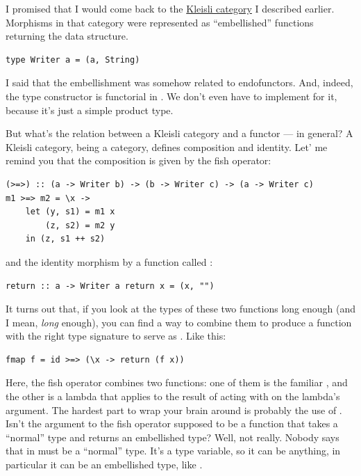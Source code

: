 I promised that I would come back to the \hyperref[kleisli-categories-page]{Kleisli
category} I described earlier. Morphisms in that category were
represented as ``embellished'' functions returning the 
data structure.

\begin{Verbatim}[commandchars=\\\{\}]
type Writer a = (a, String)
\end{Verbatim}
I said that the embellishment was somehow related to endofunctors. And,
indeed, the  type constructor is functorial in
. We don't even have to implement  for it,
because it's just a simple product type.

But what's the relation between a Kleisli category and a functor --- in
general? A Kleisli category, being a category, defines composition and
identity. Let' me remind you that the composition is given by the fish
operator:

\begin{Verbatim}
(>=>) :: (a -> Writer b) -> (b -> Writer c) -> (a -> Writer c)
m1 >=> m2 = \x ->
    let (y, s1) = m1 x
        (z, s2) = m2 y 
    in (z, s1 ++ s2)
\end{Verbatim}
and the identity morphism by a function called :

\begin{Verbatim}[commandchars=\\\{\}]
return :: a -> Writer a return x = (x, "")
\end{Verbatim}
It turns out that, if you look at the types of these two functions long
enough (and I mean, \emph{long} enough), you can find a way to combine
them to produce a function with the right type signature to serve as
. Like this:

\begin{Verbatim}
fmap f = id >=> (\x -> return (f x))
\end{Verbatim}
Here, the fish operator combines two functions: one of them is the
familiar , and the other is a lambda that applies
 to the result of acting with  on the lambda's
argument. The hardest part to wrap your brain around is probably the use
of . Isn't the argument to the fish operator supposed to be a
function that takes a ``normal'' type and returns an embellished type?
Well, not really. Nobody says that  in
 must be a ``normal'' type. It's a
type variable, so it can be anything, in particular it can be an
embellished type, like .

